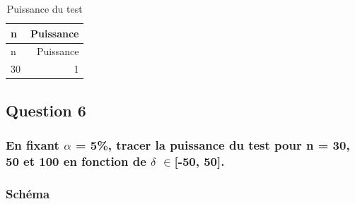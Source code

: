 \documentclass[
]{article}
\begin{document}
\begin{longtable}[]{@{}lr@{}}
\caption{Puissance du test}\tabularnewline
\toprule()
n & Puissance \\
\midrule()
\endfirsthead
\toprule()
n & Puissance \\
\midrule()
\endhead
30 & 1 \\
\bottomrule()
\end{longtable}

\hypertarget{question-6}{%
\subsection{Question 6}\label{question-6}}

\hypertarget{en-fixant-alpha-5-tracer-la-puissance-du-test-pour-n-30-50-et-100-en-fonction-de-delta-in-50-50.}{%
\subsubsection{\texorpdfstring{En fixant \(\alpha\) = 5\%, tracer la
puissance du test pour n = 30, 50 et 100 en fonction de \(\delta\)
\(\in\){[}-50,
50{]}.}{En fixant \textbackslash alpha = 5\%, tracer la puissance du test pour n = 30, 50 et 100 en fonction de \textbackslash delta \textbackslash in{[}-50, 50{]}.}}\label{en-fixant-alpha-5-tracer-la-puissance-du-test-pour-n-30-50-et-100-en-fonction-de-delta-in-50-50.}}

\hypertarget{schuxe9ma}{%
\subsubsection{Schéma}\label{schuxe9ma}}
\end{document}
